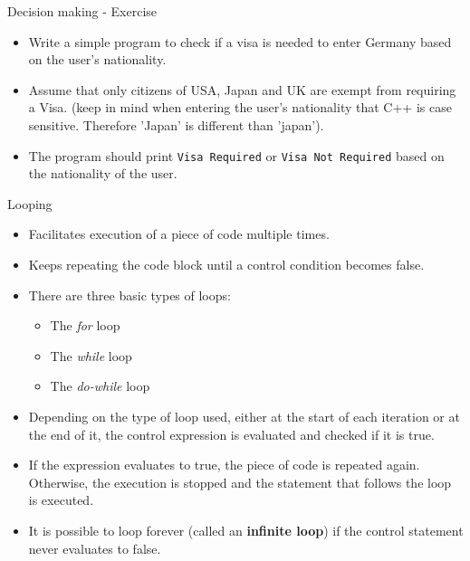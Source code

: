 \documentclass[aspectratio=169]{beamer}
\begin{document}
\begin{frame}[fragile]{Decision making - Exercise}
	\begin{itemize}
		\item Write a simple program to check if a visa is needed to enter Germany based on the user's nationality.
		\item Assume that only citizens of USA, Japan and UK are exempt from requiring a Visa. (keep in mind when entering the user's nationality that C++ is case sensitive. Therefore 'Japan' is different than 'japan').
		\item The program should print \verb|Visa Required| or \verb|Visa Not Required| based on the nationality of the user.
	\end{itemize}
\end{frame}

\begin{frame}[fragile]{Looping}
	\begin{itemize}
		\item Facilitates execution of a piece of code multiple times.
		\item Keeps repeating the code block until a control condition becomes false.
		\item There are three basic types of loops:
		\begin{itemize}
			\item The \textit{for} loop
			\item The \textit{while} loop
			\item The \textit{do-while} loop
		\end{itemize}
		\item Depending on the type of loop used, either at the start of each iteration or at the end of it, the control expression is evaluated and checked if it is true.
		\item If the expression evaluates to true, the piece of code is repeated again. Otherwise, the execution is stopped and the statement that follows the loop is executed.
		\item It is possible to loop forever (called an \textbf{infinite loop}) if the control statement never evaluates to false.
	\end{itemize}
\end{frame}
\end{document}
